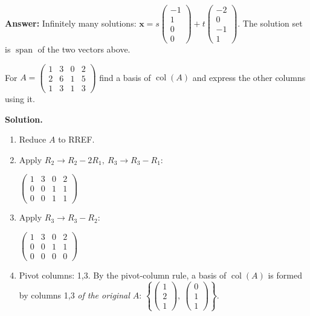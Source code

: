 \documentclass[11pt]{article}
\begin{document}
\begin{tcolorbox}[breakable,colback=white,colframe=ink!60,title={\bfseries Example 5 \textperiodcentered\ A homogeneous system}]
\begin{enumerate}[leftmargin=1.6em,itemsep=1pt,topsep=2pt,label=\arabic*.]
\end{enumerate}\textbf{Answer:} Infinitely many solutions: $\mathbf x=s\begin{pmatrix}-1\\1\\0\\0\end{pmatrix}+t\begin{pmatrix}-2\\0\\-1\\1\end{pmatrix}$. The solution set is $\operatorname{span}$ of the two vectors above.
\end{tcolorbox}
\begin{tcolorbox}[breakable,colback=white,colframe=ink!60,title={\bfseries Example 6 \textperiodcentered\ Column space basis and column relations}]For $A=\begin{pmatrix}1 & 3 & 0 & 2 \\ 2 & 6 & 1 & 5 \\ 1 & 3 & 1 & 3\end{pmatrix}$ find a basis of $\operatorname{col}(A)$ and express the other columns using it.
\par\smallskip
\textbf{Solution.} \begin{enumerate}[leftmargin=1.6em,itemsep=1pt,topsep=2pt,label=\arabic*.]\item Reduce $A$ to RREF.
\item Apply $R_2\to R_2-2R_1,\ R_3\to R_3-R_1$:\par\smallskip $\displaystyle \begin{pmatrix}1 & 3 & 0 & 2 \\ 0 & 0 & 1 & 1 \\ 0 & 0 & 1 & 1\end{pmatrix}$
\item Apply $R_3\to R_3-R_2$:\par\smallskip $\displaystyle \begin{pmatrix}1 & 3 & 0 & 2 \\ 0 & 0 & 1 & 1 \\ 0 & 0 & 0 & 0\end{pmatrix}$
\item Pivot columns: 1,3. By the pivot-column rule, a basis of $\operatorname{col}(A)$ is formed by columns 1,3 \emph{of the original $A$}: $\left\{\begin{pmatrix}1\\2\\1\end{pmatrix},\ \begin{pmatrix}0\\1\\1\end{pmatrix}\right\}$.

\end{enumerate}
\end{tcolorbox}
\end{document}
